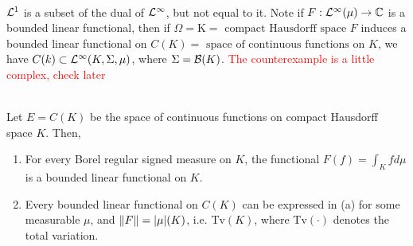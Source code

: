 \begin{remark}\ \\
$\mathcal{L}^1$ is a subset of the dual of $\mathcal{L}^\infty$, but not equal to it. Note if $F: \mathcal{L}^\infty (\mu) \to \mathbb{C}$ is a bounded linear functional, then if $\Omega = \mathrm{K} = \text{ compact Hausdorff space } F$ induces a bounded linear functional on $C(K) = \text{ space of continuous functions on } K$, we have $C(k) \subset \mathcal{L}^\infty (K, \Sigma, \mu)$, where $\Sigma = \mathcal{B}(K)$. \textcolor{red}{The counterexample is a little complex, check later}
\end{remark}

\begin{theorem}\label{RRT2}\ \\
Let $E = C(K)$ be the space of continuous functions on compact Hausdorff space $K$. Then,
\begin{enumerate}[label = (\alph*)]
    \item For every Borel regular signed measure on $K$, the functional $F(f) = \int_K f d\mu$ is a bounded linear functional on $K$.
    \item Every bounded linear functional on $C(K)$ can be expressed in (a) for some measurable $\mu$, and $\norm{F} = \abs{\mu} (K)$, i.e. $\text{Tv}(K)$, where $\text{Tv}(\cdot)$ denotes the total variation. 
\end{enumerate}
\end{theorem}


\vspace{12pt}
